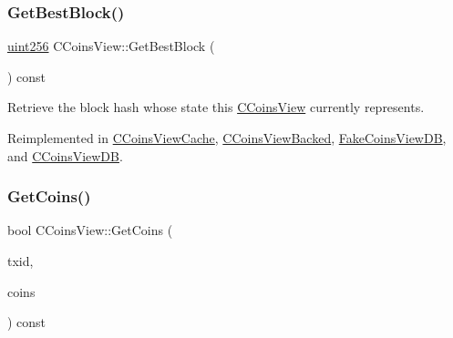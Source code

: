 \mbox{\label{class_c_coins_view_af81f2907d360a2548d59a61388e5e5cb}} 
\subsubsection{\texorpdfstring{Get\+Best\+Block()}{GetBestBlock()}}
{\footnotesize\ttfamily \mbox{\hyperlink{classuint256}{uint256}} C\+Coins\+View\+::\+Get\+Best\+Block (\begin{DoxyParamCaption}{ }\end{DoxyParamCaption}) const\hspace{0.3cm}{\ttfamily [virtual]}}



Retrieve the block hash whose state this \mbox{\hyperlink{class_c_coins_view}{C\+Coins\+View}} currently represents. 



Reimplemented in \mbox{\hyperlink{class_c_coins_view_cache_a1190c94a943c067d13211179ef06470b}{C\+Coins\+View\+Cache}}, \mbox{\hyperlink{class_c_coins_view_backed_a39bca41ae922d0ce7f40e8aeab289280}{C\+Coins\+View\+Backed}}, \mbox{\hyperlink{class_fake_coins_view_d_b_a36231d924114fbe51a830c9c235c50ad}{Fake\+Coins\+View\+DB}}, and \mbox{\hyperlink{class_c_coins_view_d_b_ac9c513a34b9e58d942fdbeafd9e5bbce}{C\+Coins\+View\+DB}}.

\mbox{\label{class_c_coins_view_a67d865358127bef1f0011a23d5158a9f}} 
\subsubsection{\texorpdfstring{Get\+Coins()}{GetCoins()}}
{\footnotesize\ttfamily bool C\+Coins\+View\+::\+Get\+Coins (\begin{DoxyParamCaption}\item[{const \mbox{\hyperlink{classuint256}{uint256}} \&}]{txid,  }\item[{\mbox{\hyperlink{class_c_coins}{C\+Coins}} \&}]{coins }\end{DoxyParamCaption}) const\hspace{0.3cm}{\ttfamily [virtual]}}



